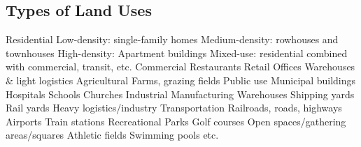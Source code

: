 \documentclass{article}
\begin{document}
    \subsection{Types of Land Uses}
    \begin{outline}
        \1 Residential 
            \2 Low-density: single-family homes 
            \2 Medium-density: rowhouses and townhouses
            \2 High-density: Apartment buildings 
            \2 Mixed-use: residential combined with commercial, transit, etc. 
        \1 Commercial
            \2 Restaurants
            \2 Retail 
            \2 Offices
            \2 Warehouses \& light logistics
        \1 Agricultural
            \2 Farms, grazing fields
        \1 Public use 
            \2 Municipal buildings 
            \2 Hospitals 
            \2 Schools
            \2 Churches
        \1 Industrial
            \2 Manufacturing
            \2 Warehouses
            \2 Shipping yards
            \2 Rail yards
            \2 Heavy logistics/industry
        \1 Transportation 
            \2 Railroads, roads, highways
            \2 Airports
            \2 Train stations 
        \1 Recreational
            \2 Parks
            \2 Golf courses
            \2 Open spaces/gathering areas/squares
            \2 Athletic fields
            \2 Swimming pools etc.
    \end{outline}
\end{document}
